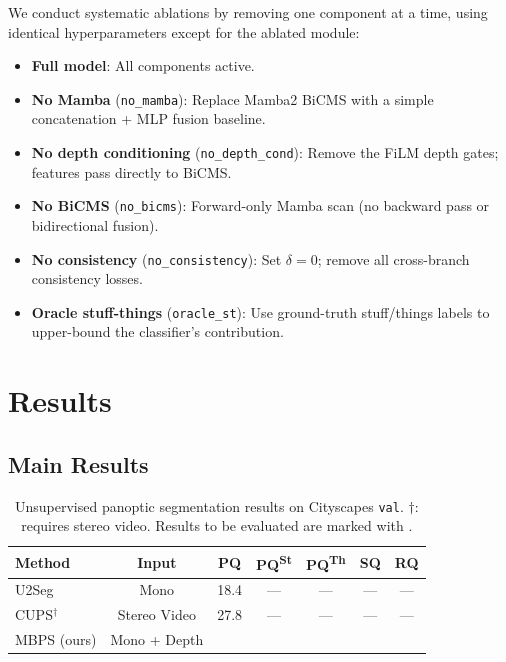 \documentclass{article}
\begin{document}
We conduct systematic ablations by removing one component at a time, using identical hyperparameters except for the ablated module:

\begin{itemize}
    \item \textbf{Full model}: All components active.
    \item \textbf{No Mamba} (\texttt{no\_mamba}): Replace Mamba2 BiCMS with a simple concatenation + MLP fusion baseline.
    \item \textbf{No depth conditioning} (\texttt{no\_depth\_cond}): Remove the FiLM depth gates; features pass directly to BiCMS.
    \item \textbf{No BiCMS} (\texttt{no\_bicms}): Forward-only Mamba scan (no backward pass or bidirectional fusion).
    \item \textbf{No consistency} (\texttt{no\_consistency}): Set $\delta = 0$; remove all cross-branch consistency losses.
    \item \textbf{Oracle stuff-things} (\texttt{oracle\_st}): Use ground-truth stuff/things labels to upper-bound the classifier's contribution.
\end{itemize}


\section{Results}
\label{sec:results}

\subsection{Main Results}

\begin{table}[t]
\centering
\caption{Unsupervised panoptic segmentation results on Cityscapes \texttt{val}. $\dagger$: requires stereo video. Results to be evaluated are marked with \underline{\hspace{1em}}.}
\label{tab:main_cityscapes}
\begin{tabular}{lcccccc}
\toprule
\textbf{Method} & \textbf{Input} & \textbf{PQ} & \textbf{PQ\textsuperscript{St}} & \textbf{PQ\textsuperscript{Th}} & \textbf{SQ} & \textbf{RQ} \\
\midrule
U2Seg~\cite{niu2024u2seg} & Mono & 18.4 & --- & --- & --- & --- \\
CUPS$^\dagger$~\cite{hahn2025cups} & Stereo Video & 27.8 & --- & --- & --- & --- \\
\midrule
MBPS (ours) & Mono + Depth & \underline{\hspace{2em}} & \underline{\hspace{2em}} & \underline{\hspace{2em}} & \underline{\hspace{2em}} & \underline{\hspace{2em}} \\
\bottomrule
\end{tabular}
\end{table}
\end{document}
